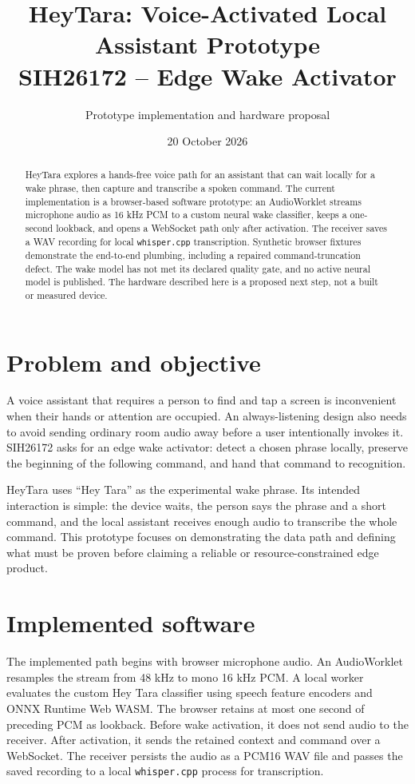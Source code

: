 \documentclass[11pt]{article}
\title{HeyTara: Voice-Activated Local Assistant Prototype\\\large SIH26172 -- Edge Wake Activator}
\author{Prototype implementation and hardware proposal}
\date{20 October 2026}
\begin{document}
\maketitle
\begin{abstract}
HeyTara explores a hands-free voice path for an assistant that can wait locally for a wake phrase, then capture and transcribe a spoken command. The current implementation is a browser-based software prototype: an AudioWorklet streams microphone audio as 16 kHz PCM to a custom neural wake classifier, keeps a one-second lookback, and opens a WebSocket path only after activation. The receiver saves a WAV recording for local \texttt{whisper.cpp} transcription. Synthetic browser fixtures demonstrate the end-to-end plumbing, including a repaired command-truncation defect. The wake model has not met its declared quality gate, and no active neural model is published. The hardware described here is a proposed next step, not a built or measured device.
\end{abstract}
\section{Problem and objective}
A voice assistant that requires a person to find and tap a screen is inconvenient when their hands or attention are occupied. An always-listening design also needs to avoid sending ordinary room audio away before a user intentionally invokes it. SIH26172 asks for an edge wake activator: detect a chosen phrase locally, preserve the beginning of the following command, and hand that command to recognition.

HeyTara uses ``Hey Tara'' as the experimental wake phrase. Its intended interaction is simple: the device waits, the person says the phrase and a short command, and the local assistant receives enough audio to transcribe the whole command. This prototype focuses on demonstrating the data path and defining what must be proven before claiming a reliable or resource-constrained edge product.
\section{Implemented software}
The implemented path begins with browser microphone audio. An AudioWorklet resamples the stream from 48 kHz to mono 16 kHz PCM. A local worker evaluates the custom Hey Tara classifier using speech feature encoders and ONNX Runtime Web WASM. The browser retains at most one second of preceding PCM as lookback. Before wake activation, it does not send audio to the receiver. After activation, it sends the retained context and command over a WebSocket. The receiver persists the audio as a PCM16 WAV file and passes the saved recording to a local \texttt{whisper.cpp} process for transcription.
\end{document}
